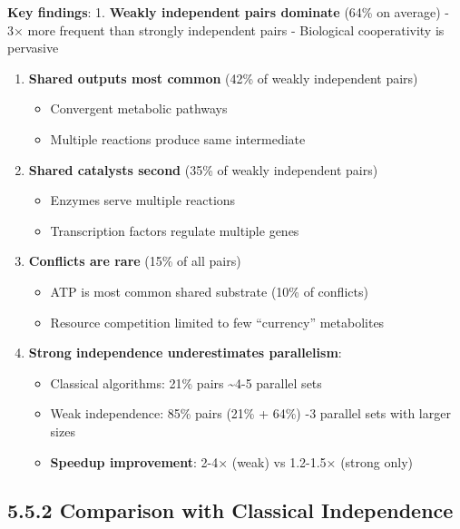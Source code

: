 \textbf{Key findings}: 1. \textbf{Weakly independent pairs dominate}
(64\% on average) - 3× more frequent than strongly independent pairs -
Biological cooperativity is pervasive

\begin{enumerate}
\def\labelenumi{\arabic{enumi}.}
\setcounter{enumi}{1}
\tightlist
\item
  \textbf{Shared outputs most common} (42\% of weakly independent pairs)

  \begin{itemize}
  \tightlist
  \item
    Convergent metabolic pathways
  \item
    Multiple reactions produce same intermediate
  \end{itemize}
\item
  \textbf{Shared catalysts second} (35\% of weakly independent pairs)

  \begin{itemize}
  \tightlist
  \item
    Enzymes serve multiple reactions
  \item
    Transcription factors regulate multiple genes
  \end{itemize}
\item
  \textbf{Conflicts are rare} (15\% of all pairs)

  \begin{itemize}
  \tightlist
  \item
    ATP is most common shared substrate (10\% of conflicts)
  \item
    Resource competition limited to few ``currency'' metabolites
  \end{itemize}
\item
  \textbf{Strong independence underestimates parallelism}:

  \begin{itemize}
  \tightlist
  \item
    Classical algorithms: 21\% pairs \textrightarrow \textasciitilde4-5 parallel sets
  \item
    Weak independence: 85\% pairs (21\% + 64\%) -3 parallel sets with
    larger sizes
  \item
    \textbf{Speedup improvement}: 2-4× (weak) vs 1.2-1.5× (strong only)
  \end{itemize}
\end{enumerate}

\hypertarget{comparison-with-classical-independence}{%
\subsection{5.5.2 Comparison with Classical
Independence}\label{comparison-with-classical-independence}}


